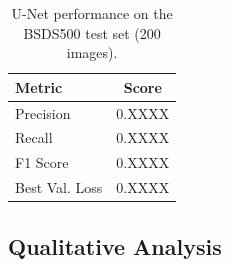 \documentclass[12pt, a4paper]{article}
\begin{document}
\begin{table}[H]
    \centering
    \caption{U-Net performance on the BSDS500 test set (200 images).}
    \label{tab:results}
    \begin{tabular}{lc}
        \toprule
        \textbf{Metric}   & \textbf{Score} \\
        \midrule
        Precision          & 0.XXXX \\
        Recall             & 0.XXXX \\
        F1 Score           & 0.XXXX \\
        Best Val. Loss     & 0.XXXX \\
        \bottomrule
    \end{tabular}
\end{table}




\subsection{Qualitative Analysis}
\end{document}
